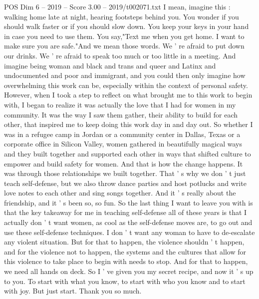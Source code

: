 \begin{textsample}{POS Dim 6 – 2019 – Score 3.00 – 2019/t002071.txt}
I mean, imagine this : walking home late at night, hearing footsteps behind you.
You wonder if you should walk faster or if you should slow down.
You keep your keys in your hand in case you need to use them.
You say,"Text me when you get home.
I want to make sure you are safe."And we mean those words.
We ' re afraid to put down our drinks.
We ' re afraid to speak too much or too little in a meeting.
And imagine being woman and black and trans and queer and Latinx and undocumented and poor and immigrant, and you could then only imagine how overwhelming this work can be, especially within the context of personal safety.
However, when I took a step to reflect on what brought me to this work to begin with, I began to realize it was actually the love that I had for women in my community.
It was the way I saw them gather, their ability to build for each other, that inspired me to keep doing this work day in and day out.
So whether I was in a refugee camp in Jordan or a community center in Dallas, Texas or a corporate office in Silicon Valley, women gathered in beautifully magical ways and they built together and supported each other in ways that shifted culture to empower and build safety for women.
And that is how the change happens.
It was through those relationships we built together.
That ' s why we don ' t just teach self-defense, but we also throw dance parties and host potlucks and write love notes to each other and sing songs together.
And it ' s really about the friendship, and it ' s been so, so fun.
So the last thing I want to leave you with is that the key takeaway for me in teaching self-defense all of these years is that I actually don ' t want women, as cool as the self-defense moves are, to go out and use these self-defense techniques.
I don ' t want any woman to have to de-escalate any violent situation.
But for that to happen, the violence shouldn ' t happen, and for the violence not to happen, the systems and the cultures that allow for this violence to take place to begin with needs to stop.
And for that to happen, we need all hands on deck.
So I ' ve given you my secret recipe, and now it ' s up to you.
To start with what you know, to start with who you know and to start with joy.
But just start.
Thank you so much.

\end{textsample}
